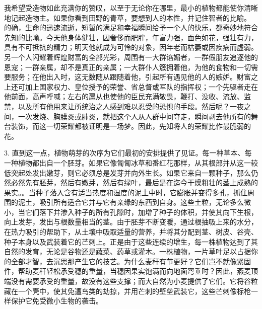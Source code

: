 我希望受造物如此充满你的赞叹，以至于无论你在哪里，最小的植物都能使你清晰地记起造物主。如果你看到田野的青草，要想到人的本性，并记住智者的比喻。 的确，生命的迅速流逝，短暂的满足和幸福瞬间给予一个人的快乐，都奇妙地符合先知的比喻。今天他身体健壮，因奢侈而肥胖，年富力强，面色如花，强壮有力，具有不可抵抗的精力；明天他就成为可怜的对象，因年老而枯萎或因疾病而虚弱。另一个人闪耀着辉煌财富的全部光彩，周围有一大群谄媚者，一群假朋友追逐他的恩宠；一群亲属，却不是真正的亲属；一大群仆人簇拥着他，为他的食物和一切需要服务；在他出入时，这无数随从跟随着他，引起所有遇见他的人的嫉妒。财富之上还可加上国家权力、皇位授予的荣誉、省总督或军队的指挥权；一个先驱者走在他前面，高声呼喊；左右的扈从也使他的臣民充满敬畏，鞭打、没收、流放、监禁，以及所有他用来让所统治之人感到难以忍受的恐惧的手段。然后呢？一夜之间，一次发烧、胸膜炎或肺炎，就把这个人从人群中间夺走，瞬间剥去他所有的舞台装饰，而这一切荣耀都被证明是一场梦。因此，先知将人的荣耀比作最脆弱的花。\par

3. 直到这一点，植物萌芽的次序为它们最初的安排提供了见证。每一种草本、每一种植物都出自一个胚芽。如果它像匍匐冰草和番红花那样，从其根部并从这一较低突起处发出嫩芽，则它必须总是发芽并向外生长。如果它来自一颗种子，那么仍然必然先有胚芽，然后有嫩芽，然后有绿叶，最后是在迄今干燥粗壮的茎上成熟的果实。。当种子落入含有适当热度和湿度的泥土中时，它膨胀并变得多孔，抓住周围的泥土，吸引所有适合它并与它有亲缘的东西到自身。这些土粒，无论多么微小，当它们落下并渗入种子的所有孔隙时，加增了种子的体积，并使其向下生根，向上发芽，发出与根数量相当的茎。由于胚芽不断变暖，通过根抽吸上来的水分，在热力吸引的帮助下，从土壤中吸取适量的营养，并将其分配到茎、树皮、谷壳、种子本身以及武装着它的芒刺上。正是由于这些连续的增生，每一株植物达到了其自然的发育，无论是谷物还是蔬菜、药草或灌木。一株植物，一片草叶足以占据你的全部才智，去沉思那产生它的技艺。为什么麦秆有节更好？它们岂不就像紧固件，帮助麦秆轻松承受穗的重量，当穗因果实饱满而向地面弯垂时？因此，燕麦顶端没有需要承受的重量，故没有这些支撑；而大自然为小麦提供了它们。它将谷粒藏在一个壳中，使其免遭鸟类的劫掠，并用芒刺的壁垒武装它，这些芒刺像标枪一样保护它免受微小生物的袭击。\par

